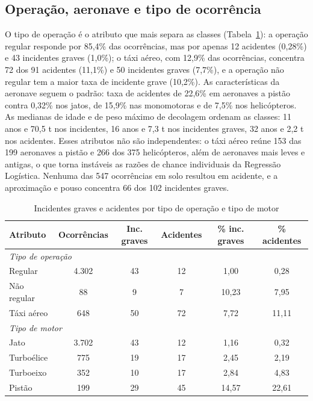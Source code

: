 \documentclass[12pt]{article}
\begin{document}
\subsection{Operação, aeronave e tipo de ocorrência}
\label{sec:operacao}

O tipo de operação é o atributo que mais separa as classes (Tabela~\ref{tab:operacao}): a operação regular responde por 85,4\% das ocorrências, mas por apenas 12 acidentes (0,28\%) e 43 incidentes graves (1,0\%); o táxi aéreo, com 12,9\% das ocorrências, concentra 72 dos 91 acidentes (11,1\%) e 50 incidentes graves (7,7\%), e a operação não regular tem a maior taxa de incidente grave (10,2\%). As características da aeronave seguem o padrão: taxa de acidentes de 22,6\% em aeronaves a pistão contra 0,32\% nos jatos, de 15,9\% nas monomotoras e de 7,5\% nos helicópteros. As medianas de idade e de peso máximo de decolagem ordenam as classes: 11 anos e 70,5 t nos incidentes, 16 anos e 7,3 t nos incidentes graves, 32 anos e 2,2 t nos acidentes. Esses atributos não são independentes: o táxi aéreo reúne 153 das 199 aeronaves a pistão e 266 dos 375 helicópteros, além de aeronaves mais leves e antigas, o que torna instáveis as razões de chance individuais da Regressão Logística. Nenhuma das 547 ocorrências em solo resultou em acidente, e a aproximação e pouso concentra 66 dos 102 incidentes graves.

\begin{table}[htbp]
    \centering
    \caption{Incidentes graves e acidentes por tipo de operação e tipo de motor}
    \vspace{0.05cm}
    \footnotesize\setlength{\tabcolsep}{5pt}\renewcommand{\arraystretch}{0.88}
    \begin{tabular}{lccccc}
\toprule
\textbf{Atributo} & \textbf{Ocorrências} & \textbf{Inc. graves} & \textbf{Acidentes} & \textbf{\% inc. graves} & \textbf{\% acidentes} \\
\midrule
\multicolumn{6}{l}{\textit{Tipo de operação}} \\
\hspace{1em}Regular & 4.302 & 43 & 12 & 1,00 & 0,28 \\
\hspace{1em}Não regular & 88 & 9 & 7 & 10,23 & 7,95 \\
\hspace{1em}Táxi aéreo & 648 & 50 & 72 & 7,72 & 11,11 \\
\multicolumn{6}{l}{\textit{Tipo de motor}} \\
\hspace{1em}Jato & 3.702 & 43 & 12 & 1,16 & 0,32 \\
\hspace{1em}Turboélice & 775 & 19 & 17 & 2,45 & 2,19 \\
\hspace{1em}Turboeixo & 352 & 10 & 17 & 2,84 & 4,83 \\
\hspace{1em}Pistão & 199 & 29 & 45 & 14,57 & 22,61 \\
\bottomrule
\end{tabular}
    \label{tab:operacao}
\end{table}
\end{document}
